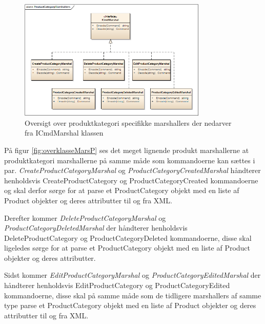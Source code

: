 \begin{figure}[H]
	\centering
	\includegraphics[width=0.8\textwidth]{Systemdesign/SharedLib/Images/Marshallers/ProductCategoryMarshallers2.png}
	\caption{Oversigt over produktkategori specifikke marshallers der nedarver fra ICmdMarshal klassen}
	\label{fig:overklasseMarsPC}
\end{figure}

På figur \ref{fig:overklasseMarsP} ses det meget lignende produkt marshallerne at produktkategori marshallerne på samme måde som kommandoerne kan sættes i par. \textit{CreateProductCategoryMarshal} og \textit{ProductCategoryCreatedMarshal} håndterer henholdsvis CreateProductCategory og ProductCategoryCreated kommandoerne og skal derfor sørge for at parse et ProductCategory objekt med en liste af Product objekter og deres attributter til og fra XML.

Derefter kommer \textit{DeleteProductCategoryMarshal} og \textit{ProductCategoryDeletedMarshal} der håndterer henholdsvis DeleteProductCategory og ProductCategoryDeleted kommandoerne, disse skal ligeledes sørge for at parse et ProductCategory objekt med en liste af Product objekter og deres attributter.

Sidst kommer \textit{EditProductCategoryMarshal} og \textit{ProductCategoryEditedMarshal} der håndterer henholdsvis EditProductCategory og ProductCategoryEdited kommandoerne, disse skal på samme måde som de tidligere marshallers af samme type parse et ProductCategory objekt med en liste af Product objekter og deres attributter til og fra XML.\\


